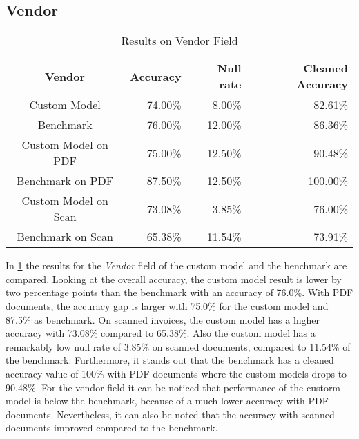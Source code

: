 \subsection*{Vendor}
\begin{table}[ht]   %
    \centering
    \footnotesize
    \begin{tabular}{c|rrr} %
        \toprule    %
        Vendor  & Accuracy  & Null rate & Cleaned Accuracy \\
        \midrule    %
        Custom Model               & 74.00\%   & 8.00\%   & 82.61\% \\
        Benchmark           & 76.00\%   & 12.00\%  & 86.36\%\\
        \midrule    %
        Custom Model on PDF        & 75.00\%   & 12.50\%  & 90.48\% \\
        Benchmark on PDF    & 87.50\%   & 12.50\%  & 100.00\% \\
        \midrule    %
        Custom Model on Scan       & 73.08\%  & 3.85\%   & 76.00\% \\
        Benchmark on Scan   & 65.38\%  & 11.54\%  & 73.91\% \\

        \bottomrule %
    \end{tabular}
    \caption{Results on Vendor Field}
    \label{table:Model_Bench_Vendor}
\end{table}

In \cref{table:Model_Bench_Vendor} the results for the \textit{Vendor} field of the custom model and the benchmark are compared. 
Looking at the overall accuracy, the custom model result is lower by two percentage points than the benchmark with an accuracy of 76.0\%. 
With PDF documents, the accuracy gap is larger with 75.0\% for the custom model and 87.5\% as benchmark. 
On scanned invoices, the custom model has a higher accuracy with 73.08\% compared to 65.38\%. 
Also the custom model has a remarkably low null rate of 3.85\% on scanned documents, compared to 11.54\% of the benchmark.
Furthermore, it stands out that the benchmark has a cleaned accuracy value of 100\% with PDF documents where the custom models drops to 90.48\%.
For the vendor field it can be noticed that performance of the custorm model is below the benchmark, because of a much lower accuracy with PDF documents.
Nevertheless, it can also be noted that the accuracy with scanned documents improved compared to the benchmark.


